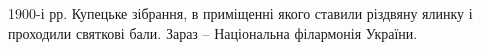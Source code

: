  
 
 
 
 


1900-і рр. Купецьке зібрання, в приміщенні якого ставили різдвяну ялинку і
проходили святкові бали. Зараз – Національна філармонія України.
